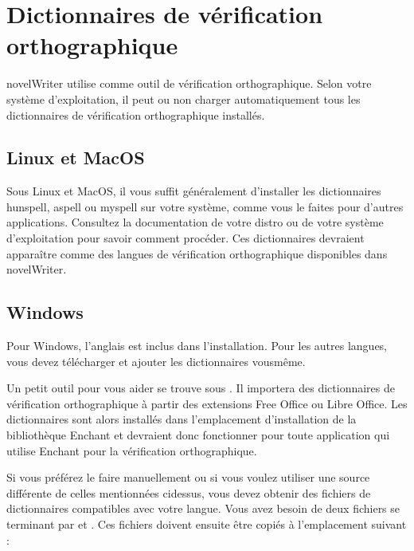 \documentclass[a4paper,11pt,french]{sphinxmanual}
\begin{document}
\section{Dictionnaires de vérification orthographique}
\label{\detokenize{more_customise:spell-check-dictionaries}}\label{\detokenize{more_customise:a-custom-dict}}
\sphinxAtStartPar
novelWriter utilise  comme outil de vérification orthographique. Selon votre système d’exploitation, il peut ou non charger automatiquement tous les dictionnaires de vérification orthographique installés.


\subsection{Linux et MacOS}
\label{\detokenize{more_customise:linux-and-macos}}
\sphinxAtStartPar
Sous Linux et MacOS, il vous suffit généralement d’installer les dictionnaires hunspell, aspell ou myspell sur votre système, comme vous le faites pour d’autres applications. Consultez la documentation de votre distro ou de votre système d’exploitation pour savoir comment procéder. Ces dictionnaires devraient apparaître comme des langues de vérification orthographique disponibles dans novelWriter.


\subsection{Windows}
\label{\detokenize{more_customise:windows}}
\sphinxAtStartPar
Pour Windows, l’anglais est inclus dans l’installation. Pour les autres langues, vous devez télécharger et ajouter les dictionnaires vous\sphinxhyphen{}même.

\sphinxAtStartPar
{}

\sphinxAtStartPar
Un petit outil pour vous aider se trouve sous . Il importera des dictionnaires de vérification orthographique à partir des extensions Free Office ou Libre Office. Les dictionnaires sont alors installés dans l’emplacement d’installation de la bibliothèque Enchant et devraient donc fonctionner pour toute application qui utilise Enchant pour la vérification orthographique.

\sphinxAtStartPar
{}

\sphinxAtStartPar
Si vous préférez le faire manuellement ou si vous voulez utiliser une source différente de celles mentionnées ci\sphinxhyphen{}dessus, vous devez obtenir des fichiers de dictionnaires compatibles avec votre langue. Vous avez besoin de deux fichiers se terminant par  et . Ces fichiers doivent ensuite être copiés à l’emplacement suivant :
\end{document}
